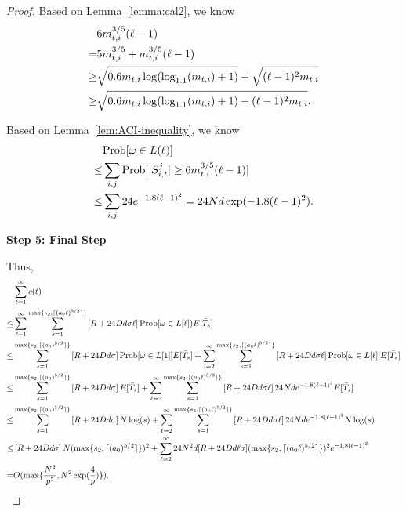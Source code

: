 \begin{proof}
Based on Lemma~\ref{lemma:cal2}, we know
\begin{align}
&6m_{t,i}^{3/5}(\ell-1) \nonumber \\
=& 5m_{t,i}^{3/5} + m_{t,i}^{3/5}(\ell-1) \nonumber \\
\geq & \sqrt{0.6m_{t,i}\log(\log_{1.1}(m_{t,i})+1)} + \sqrt{(\ell-1)^2 m_{t,i}} \nonumber \\
\geq & \sqrt{0.6m_{t,i}\log(\log_{1.1}(m_{t,i})+1)+(\ell-1)^2 m_{t,i}}. \nonumber
\end{align}

Based on Lemma~\ref{lem:ACI-inequality}, we know
\begin{align}
& \Prob{\omega\in L(\ell)} \nonumber \\
\leq &\sum_{i,j}\Prob{|S_{i,t}^{j}|\geq 6\NumPull{t}{i}^{3/5}(\ell-1)} \nonumber \\
\leq & \sum_{i,j}24e^{-1.8(\ell-1)^2} = 24\ARMNUM d\exp(-1.8(\ell-1)^2). \nonumber
\end{align}

\noindent\textbf{Step 5: Final Step}

Thus,
\begin{align}
&\sum_{t=1}^{\infty}c(t) \nonumber \\
\leq&\sum_{\ell=1}^{\infty}\sum_{s=1}^{\max\{s_2,\lceil (a_0 \ell)^{5/2} \rceil\}}\left[\MAXR+24\Diam d\sigma \ell\right]\Prob{\omega\in L[\ell])E[\bar{T}_{s}} \nonumber \\
\leq& \sum_{s=1}^{\max\{s_2,\lceil (a_0)^{5/2} \rceil\}}\left[\MAXR+24\Diam d\sigma \right]\Prob{\omega\in L[1]}E[\bar{T}_{s}] +\sum_{l=2}^{\infty}\sum_{s=1}^{\max\{s_2,\lceil (a_0 \ell)^{5/2} \rceil\}}\left[\MAXR+24\Diam d\sigma \ell\right]\Prob{\omega\in L[\ell]}E[\bar{T}_{s}] \nonumber \\
\leq& \sum_{s=1}^{\max\{s_2,\lceil (a_0)^{5/2} \rceil\}}\left[R+24\Diam d\sigma \right]E[\bar{T}_{s}] +\sum_{\ell=2}^{\infty}\sum_{s=1}^{\max\{s_2,\lceil (a_0 \ell)^{5/2} \rceil\}}\left[\MAXR+24\Diam d\sigma \ell\right]24\ARMNUM d e^{-1.8(\ell-1)^2}E[\bar{T}_{s}]\nonumber \\
\leq& \sum_{s=1}^{\max\{s_2,\lceil (a_0)^{5/2} \rceil\}}\left[\MAXR+24\Diam d\sigma \right]\ARMNUM \log(s) +\sum_{\ell=2}^{\infty}\sum_{s=1}^{\max\{s_2,\lceil (a_0 \ell)^{5/2} \rceil\}}\left[\MAXR+24\Diam d\sigma \ell\right]24 \ARMNUM d e^{-1.8(\ell-1)^2}\ARMNUM \log(s) \nonumber \\
\leq & \left[\MAXR+24\Diam d\sigma \right]\ARMNUM (\max\{s_2,\lceil (a_0)^{5/2} \rceil\})^2+\sum_{\ell=2}^{\infty}24\ARMNUM^2 d[\MAXR+24\Diam d\ell\sigma](\max\{s_2,\lceil (a_0 \ell)^{5/2} \rceil\})^2 e^{-1.8(\ell-1)^2} \nonumber \\
=& O(\max\{\frac{\ARMNUM^2}{\MinProb^5},\ARMNUM^2\exp(\frac{4}{\MinProb})\}). \nonumber
\end{align}

\end{proof}

